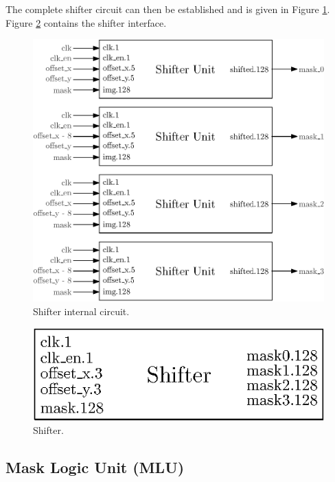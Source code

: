 The complete shifter circuit can then be established and is given in Figure \ref{fig:gpu/shifter_in}. 
Figure \ref{fig:gpu/shifter} contains the shifter interface.

\begin{figure}[H]
    \centering
    \includegraphics[scale=1.0]{Chapter4-GPU_CLKU/res/shifter_in}
    \caption{Shifter internal circuit.}
    \label{fig:gpu/shifter_in}
\end{figure}

\begin{figure}[H]
    \centering
    \includegraphics[scale=1.0]{Chapter4-GPU_CLKU/res/shifter}
    \caption{Shifter.}
    \label{fig:gpu/shifter}
\end{figure}


\subsection{Mask Logic Unit (MLU)}


